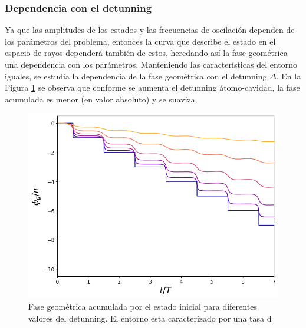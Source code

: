 \subsubsection{Dependencia con el detunning}
Ya que las amplitudes de los estados y las frecuencias de oscilación dependen de los parámetros del problema, entonces la curva que describe el estado en el espacio de rayos dependerá también de estos, heredando así la fase geométrica una dependencia con los parámetros. Manteniendo las características del entorno iguales, se estudia la dependencia de la fase geométrica con el detunning $\Delta$. En la Figura \ref{fig3:fg detunning} se observa que conforme se aumenta el detunning átomo-cavidad, la fase acumulada es menor (en valor absoluto) y se suaviza.
\begin{figure}[H]
    \begin{minipage}[c]{0.67\textwidth}
        \includegraphics[width=\textwidth]{figuras/ch3/fg detunning.png}
    \end{minipage}\hfill
    \begin{minipage}[c]{0.3\textwidth}
    \caption{Fase geométrica acumulada por el estado inicial para diferentes valores del detunning. El entorno esta caracterizado por una tasa d}
    \label{fig3:fg detunning}
  \end{minipage}
\end{figure}

